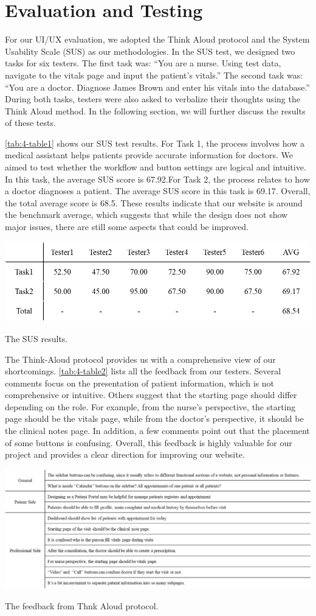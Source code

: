 %
%
\chapter{Evaluation and Testing}
\label{chap:testing}

For our UI/UX evaluation, we adopted the Think Aloud protocol and the System Usability Scale (SUS) as our methodologies. In the SUS test, we designed two tasks for six testers. The first task was: “You are a nurse. Using test data, navigate to the vitals page and input the patient’s vitals.” The second task was: “You are a doctor. Diagnose James Brown and enter his vitals into the database.” During both tasks, testers were also asked to verbalize their thoughts using the Think Aloud method. In the following section, we will further discuss the results of these tests.

\ref{tab:4-table1} shows our SUS test results. For Task 1, the process involves how a medical assistant helps patients provide accurate information for doctors. We aimed to test whether the workflow and button settings are logical and intuitive. In this task, the average SUS score is 67.92.For Task 2, the process relates to how a doctor diagnoses a patient. The average SUS score in this task is 69.17. Overall, the total average score is 68.5. These results indicate that our website is around the benchmark average, which suggests that while the design does not show major issues, there are still some aspects that could be improved.

\begin{table}[H]
  \centering
  \includegraphics[width=0.8\linewidth]{images04/table1.png}
  \caption{The SUS results.}
  \label{tab:4-table1}
\end{table}

The Think-Aloud protocol provides us with a comprehensive view of our shortcomings. \ref{tab:4-table2} lists all the feedback from our testers. Several comments focus on the presentation of patient information, which is not comprehensive or intuitive. Others suggest that the starting page should differ depending on the role. For example, from the nurse’s perspective, the starting page should be the vitals page, while from the doctor’s perspective, it should be the clinical notes page. In addition, a few comments point out that the placement of some buttons is confusing. Overall, this feedback is highly valuable for our project and provides a clear direction for improving our website.

\begin{table}[H]
  \centering
  \includegraphics[width=0.8\linewidth]{images04/table2.png}
  \caption{The feedback from Thnk Aloud protocol.}
  \label{tab:4-table2}
\end{table}